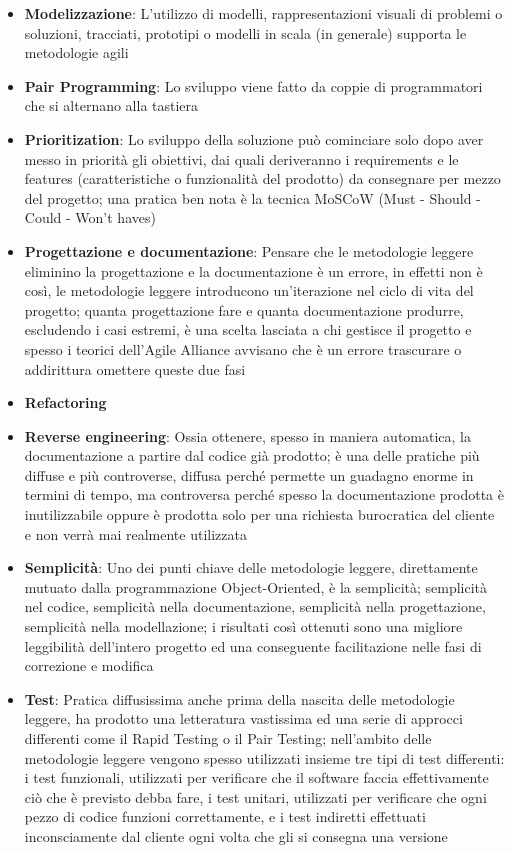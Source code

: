 \documentclass[11pt,a4paper]{book}
\begin{document}
\begin{itemize}
	\item \textbf{Modelizzazione}: L'utilizzo di modelli, rappresentazioni visuali di problemi o soluzioni, tracciati, prototipi o modelli in scala (in generale) supporta le metodologie agili
	\item \textbf{Pair Programming}: Lo sviluppo viene fatto da coppie di programmatori che si alternano alla tastiera
	\item \textbf{Prioritization}: Lo sviluppo della soluzione può cominciare solo dopo aver messo in priorità gli obiettivi, dai quali deriveranno i requirements e le features (caratteristiche o funzionalità del prodotto) da consegnare per mezzo del progetto; una pratica ben nota è la tecnica MoSCoW (Must - Should - Could - Won't haves)
	\item \textbf{Progettazione e documentazione}: Pensare che le metodologie leggere eliminino la progettazione e la documentazione è un errore, in effetti non è così, le metodologie leggere introducono un'iterazione nel ciclo di vita del progetto; quanta progettazione fare e quanta documentazione produrre, escludendo i casi estremi, è una scelta lasciata a chi gestisce il progetto e spesso i teorici dell'Agile Alliance avvisano che è un errore trascurare o addirittura omettere queste due fasi
	\item \textbf{Refactoring}
	\item \textbf{Reverse engineering}: Ossia ottenere, spesso in maniera automatica, la documentazione a partire dal codice già prodotto; è una delle pratiche più diffuse e più controverse, diffusa perché permette un guadagno enorme in termini di tempo, ma controversa perché spesso la documentazione prodotta è inutilizzabile oppure è prodotta solo per una richiesta burocratica del cliente e non verrà mai realmente utilizzata
	\item \textbf{Semplicità}: Uno dei punti chiave delle metodologie leggere, direttamente mutuato dalla programmazione Object-Oriented, è la semplicità; semplicità nel codice, semplicità nella documentazione, semplicità nella progettazione, semplicità nella modellazione; i risultati così ottenuti sono una migliore leggibilità dell'intero progetto ed una conseguente facilitazione nelle fasi di correzione e modifica
	\item \textbf{Test}: Pratica diffusissima anche prima della nascita delle metodologie leggere, ha prodotto una letteratura vastissima ed una serie di approcci differenti come il Rapid Testing o il Pair Testing; nell'ambito delle metodologie leggere vengono spesso utilizzati insieme tre tipi di test differenti: i test funzionali, utilizzati per verificare che il software faccia effettivamente ciò che è previsto debba fare, i test unitari, utilizzati per verificare che ogni pezzo di codice funzioni correttamente, e i test indiretti effettuati inconsciamente dal cliente ogni volta che gli si consegna una versione

\end{itemize}
\end{document}
